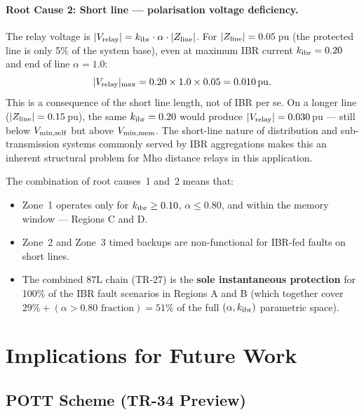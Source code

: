 \documentclass[11pt,a4paper]{article}
\begin{document}
\paragraph{Root Cause 2: Short line — polarisation voltage deficiency.}
The relay voltage is $|V_{\rm relay}| = k_{\rm ibr}\cdot\alpha\cdot|Z_{\rm line}|$.
For $|Z_{\rm line}| = 0.05$\,pu (the protected line is only 5\% of the
system base), even at maximum IBR current $k_{\rm ibr} = 0.20$ and end
of line $\alpha = 1.0$:
\begin{equation}
  |V_{\rm relay}|_{\rm max} = 0.20 \times 1.0 \times 0.05 = 0.010\,\text{pu}.
  \label{eq:vmax}
\end{equation}
This is a consequence of the short line length, not of IBR per se.
On a longer line ($|Z_{\rm line}| = 0.15$\,pu), the same $k_{\rm ibr} = 0.20$
would produce $|V_{\rm relay}| = 0.030$\,pu — still below $V_{\rm min,self}$
but above $V_{\rm min,mem}$.  The short-line nature of distribution and
sub-transmission systems commonly served by IBR aggregations makes this
an inherent structural problem for Mho distance relays in this application.

The combination of root causes~1 and~2 means that:

\begin{itemize}
  \item Zone~1 operates only for $k_{\rm ibr} \geq 0.10$,
    $\alpha \leq 0.80$, and within the memory window — Regions C and D.
  \item Zone~2 and Zone~3 timed backups are non-functional for IBR-fed
    faults on short lines.
  \item The combined 87L chain (TR-27) is the \textbf{sole instantaneous
    protection} for 100\% of the IBR fault scenarios in Regions A and B
    (which together cover $29\% + (\alpha > 0.80\text{ fraction}) = 51\%$
    of the full $(\alpha, k_{\rm ibr})$ parametric space).
\end{itemize}

\section{Implications for Future Work}

\subsection{POTT Scheme (TR-34 Preview)}
\end{document}
